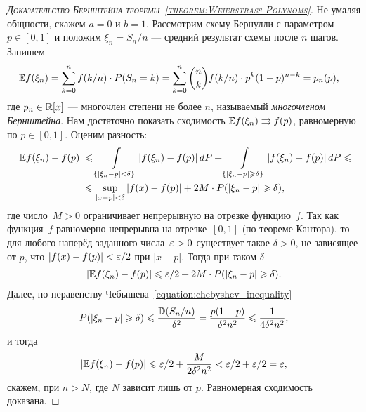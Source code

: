 \documentclass[../main.tex]{subfiles}
\begin{document}
\begin{proof}[\normalfont\textsc{Доказательство Бернштейна теоремы~\ref{theorem:Weierstrass Polynoms}}]
 Не умаляя общности, скажем $ a = 0 $ и $ b=1 $. Рассмотрим схему Бернулли с параметром $ p \in [0,1] $ и положим $ \xi_n = S_n / n $ --- средний результат схемы после $ n $ шагов. Запишем
 \begin{align*}
  \mathbb E f(\xi_n) &= \sum_{k=0}^{n} f(k/n ) \cdot P(S_n = k) = \sum_{k=0}^{n} \binom n k  f ( k/n ) \cdot p^{k}(1-p)^{n-k} = p_n(p),
 \end{align*} где $ p_n \in \mathbb{R}[x] $ --- многочлен степени не более $ n $, называемый \emph{многочленом Бернштейна}. Нам достаточно показать сходимость $ \mathbb E f(\xi_n) \rightrightarrows f(p) $, равномерную по $ p \in [0,1] $. Оценим разность:
 \begin{align*}
  \left| \mathbb E f(\xi_n) - f(p) \right| &\leqslant \int\limits_{\left\{ \left| \xi_n - p \right| < \delta \right\}} \left| f(\xi_n) - f(p) \right|dP + \int\limits_{\left\{ \left| \xi_n-p \right| \geqslant \delta \right\}} \left| f(\xi_n)-f(p) \right|dP \leqslant \\
  &\leqslant \sup_{\left| x-p \right| < \delta} \left| f(x)-f(p) \right| + 2M \cdot P(\left| \xi_n-p \right| \geqslant \delta),
 \end{align*} где число~$ M > 0 $ ограничивает непрерывную на отрезке функцию~$ f $. Так как функция~$ f $ равномерно непрерывна на отрезке~$ [0,1] $ (по теореме Кантора), то для любого наперёд заданного числа~$ \varepsilon > 0 $ существует такое $ \delta > 0 $, не зависящее от $ p $, что $ \left| f(x)-f(p) \right| < \varepsilon / 2 $ при $ \left| x - p \right| $. Тогда при таком $ \delta $
 \begin{align*}
  \left| \mathbb E f(\xi_n) - f(p) \right| \leqslant \varepsilon / 2 + 2M  \cdot P (\left| \xi_n - p \right| \geqslant \delta).
 \end{align*} Далее, по неравенству Чебышева~\eqref{equation:chebyshev_inequality}
 \begin{align*}
  P(\left| \xi_n-p \right| \geqslant \delta) \leqslant \frac{\mathbb D(S_n / n)}{\delta^{2}} = \frac{p(1-p)}{\delta^{2}n^{2}} \leqslant \frac{1}{4\delta^{2}n^{2}},
 \end{align*} и тогда
 \begin{align*}
  \left| \mathbb E f(\xi_n)-f(p) \right| \leqslant \varepsilon / 2 + \frac{M}{2\delta^{2}n^{2}} < \varepsilon / 2 + \varepsilon / 2 = \varepsilon,
 \end{align*} скажем, при $ n > N $, где $ N $ зависит лишь от $ p $. Равномерная сходимость доказана.
\end{proof}
\end{document}
